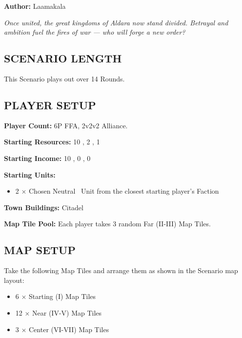 
\begin{multicols*}{2}

\textbf{Author:} Laamakala

\textit{Once united, the great kingdoms of Aldara now stand divided. Betrayal and ambition fuel the fires of war — who will forge a new order?}  %

\subsection*{\MakeUppercase{Scenario Length}}
This Scenario plays out over 14 Rounds.

\subsection*{\MakeUppercase{Player Setup}}
\textbf{Player Count:} 6P FFA, 2v2v2 Alliance.

\textbf{Starting Resources:} 10 , 2 , 1 

\textbf{Starting Income:} 10 , 0 , 0 

\textbf{Starting Units:}

\begin{itemize}
  \item 2 × Chosen Neutral \bronze\ Unit from the closest starting player's Faction
\end{itemize}

\textbf{Town Buildings:} Citadel

\textbf{Map Tile Pool:} Each player takes 3 random Far (II-III) Map Tiles.

\subsection*{\MakeUppercase{Map Setup}}
Take the following Map Tiles and arrange them as shown in the Scenario map layout:

\begin{itemize}
  \item 6 × Starting (I) Map Tiles
  \item 12 × Near (IV-V) Map Tiles
  \item 3 × Center (VI-VII) Map Tiles
\end{itemize}


\end{multicols*}
